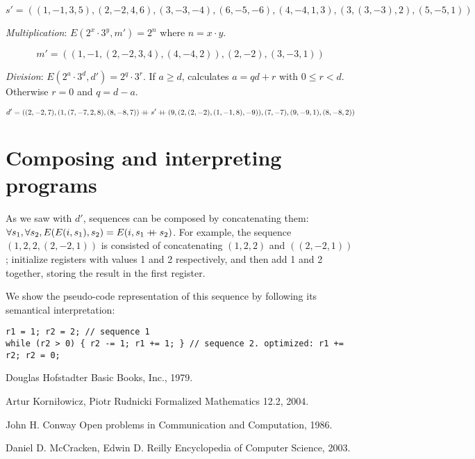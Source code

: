 \documentclass{article}
\newcommand\doubleplus{\mathbin{{+}\mspace{-8mu}{+}}}
\begin{document}
$$s' = ((1, -1, 3, 5), (2, -2, 4, 6), (3, -3, -4), (6, -5, -6), (4, -4, 1, 3), (3, (3, -3), 2), (5, -5, 1))$$

\textit{Multiplication}: $E(2^x \cdot 3^y, m') = 2^n$ where $n = x \cdot y$.

$$m' = ((1, -1, (2, -2, 3, 4), (4, -4, 2)), (2, -2), (3, -3, 1))$$

\textit{Division}: $E(2^a \cdot 3^d, d') = 2^q \cdot 3^r$. If $a \geq d$, calculates $a = qd + r$ with $0 \leq r < d$. Otherwise $r = 0$ and $q = d - a$.

$$d' = ((2, -2, 7), (1, (7, -7, 2, 8), (8, -8, 7)) \doubleplus s' \doubleplus (9, (2, (2, -2), (1, -1, 8), -9)), (7, -7), (9, -9, 1), (8, -8, 2))$$

\section{Composing and interpreting programs}

As we saw with $d'$, sequences can be composed by concatenating them: $\forall s_1, \forall s_2, E(E(i, s_1), s_2) = E(i, s_1 \doubleplus s_2)$. For example, the sequence $(1, 2, 2, (2, -2, 1))$ is consisted of concatenating $(1, 2, 2)$ and $((2, -2, 1))$; initialize registers with values 1 and 2 respectively, and then add 1 and 2 together, storing the result in the first register.

We show the pseudo-code representation of this sequence by following its semantical interpretation:

\begin{verbatim}
r1 = 1; r2 = 2; // sequence 1
while (r2 > 0) { r2 -= 1; r1 += 1; } // sequence 2. optimized: r1 += r2; r2 = 0;
\end{verbatim}

\begin{thebibliography}{1}

Douglas Hofstadter
\newblock Basic Books, Inc., 1979.

Artur Korniłowicz, Piotr Rudnicki
\newblock Formalized Mathematics 12.2, 2004.

John H. Conway
\newblock Open problems in Communication and Computation, 1986.

Daniel D. McCracken, Edwin D. Reilly
\newblock Encyclopedia of Computer Science, 2003.

\end{thebibliography}
\end{document}
